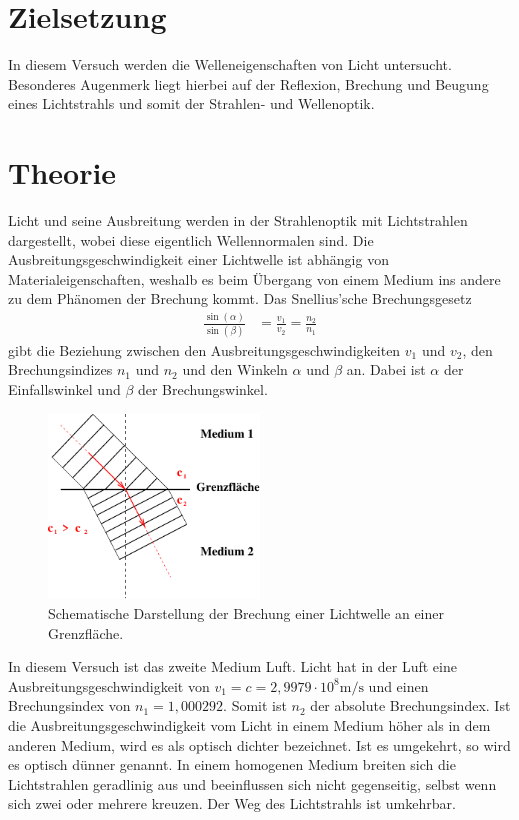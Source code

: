 \section{Zielsetzung}
\label{sec:Zielsetzung}

In diesem Versuch werden die Welleneigenschaften von Licht untersucht. Besonderes Augenmerk liegt hierbei auf der Reflexion, 
Brechung und Beugung eines Lichtstrahls und somit der Strahlen- und Wellenoptik.

\section{Theorie}
\label{sec:Theorie}
Licht und seine Ausbreitung werden in der Strahlenoptik mit Lichtstrahlen dargestellt, wobei diese eigentlich Wellennormalen sind.
Die Ausbreitungsgeschwindigkeit einer Lichtwelle ist abhängig von Materialeigenschaften, weshalb es
beim Übergang von einem Medium ins andere zu dem Phänomen der Brechung kommt.
Das Snellius'sche Brechungsgesetz
\begin{align}
    \frac{\sin(\alpha)}{\sin(\beta)}  &= \frac{v_1}{v_2} = \frac{n_2}{n_1}
    \label{eqn:Brechung}
\end{align}
gibt die Beziehung zwischen den Ausbreitungsgeschwindigkeiten $v_1$ und $v_2$, den Brechungsindizes $n_1$ und $n_2$ und den Winkeln $\alpha$ und $\beta$ an.
Dabei ist $\alpha$ der Einfallswinkel und $\beta$ der Brechungswinkel.
\begin{figure}[H]
    \centering
    \includegraphics[width=0.5\textwidth]{build/Abb_1.pdf}
    \caption {Schematische Darstellung der Brechung einer Lichtwelle an einer Grenzfläche\cite[1]{V400}.}
    \label{fig:Abb_1}
\end{figure}
In diesem Versuch ist das zweite Medium Luft. 
Licht hat in der Luft eine Ausbreitungsgeschwindigkeit von $v_1 = c = 2,9979 \cdot 10^8 \si{\meter\per\second}$ und einen Brechungsindex von $n_1 = 1,000292$.
Somit ist $n_2$ der absolute Brechungsindex.
Ist die Ausbreitungsgeschwindigkeit vom Licht in einem Medium höher als in dem anderen Medium, 
wird es als optisch dichter bezeichnet. Ist es umgekehrt, so wird es optisch dünner genannt.
In einem homogenen Medium breiten sich die Lichtstrahlen geradlinig aus und beeinflussen sich nicht gegenseitig, selbst wenn sich zwei oder mehrere kreuzen.
Der Weg des Lichtstrahls ist umkehrbar.

